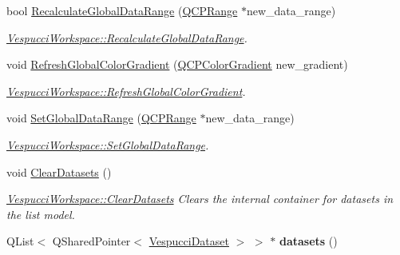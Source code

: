 \begin{DoxyCompactItemize}
\item 
bool \hyperlink{class_vespucci_workspace_a0aefd22de491420f2a172448dafc90fc}{Recalculate\+Global\+Data\+Range} (\hyperlink{class_q_c_p_range}{Q\+C\+P\+Range} $\ast$new\+\_\+data\+\_\+range)
\begin{DoxyCompactList}\small\item\em \hyperlink{class_vespucci_workspace_a0aefd22de491420f2a172448dafc90fc}{Vespucci\+Workspace\+::\+Recalculate\+Global\+Data\+Range}. \end{DoxyCompactList}\item 
void \hyperlink{class_vespucci_workspace_a616ca3bc6a0eed206870a25e484eaccb}{Refresh\+Global\+Color\+Gradient} (\hyperlink{class_q_c_p_color_gradient}{Q\+C\+P\+Color\+Gradient} new\+\_\+gradient)
\begin{DoxyCompactList}\small\item\em \hyperlink{class_vespucci_workspace_a616ca3bc6a0eed206870a25e484eaccb}{Vespucci\+Workspace\+::\+Refresh\+Global\+Color\+Gradient}. \end{DoxyCompactList}\item 
void \hyperlink{class_vespucci_workspace_a2f281b2b05af5a907405eb901ab26633}{Set\+Global\+Data\+Range} (\hyperlink{class_q_c_p_range}{Q\+C\+P\+Range} $\ast$new\+\_\+data\+\_\+range)
\begin{DoxyCompactList}\small\item\em \hyperlink{class_vespucci_workspace_a2f281b2b05af5a907405eb901ab26633}{Vespucci\+Workspace\+::\+Set\+Global\+Data\+Range}. \end{DoxyCompactList}\item 
void \hyperlink{class_vespucci_workspace_a85053e9aa9e55a70f0a54fed14b8316c}{Clear\+Datasets} ()\hypertarget{class_vespucci_workspace_a85053e9aa9e55a70f0a54fed14b8316c}{}\label{class_vespucci_workspace_a85053e9aa9e55a70f0a54fed14b8316c}

\begin{DoxyCompactList}\small\item\em \hyperlink{class_vespucci_workspace_a85053e9aa9e55a70f0a54fed14b8316c}{Vespucci\+Workspace\+::\+Clear\+Datasets} Clears the internal container for datasets in the list model. \end{DoxyCompactList}\item 
Q\+List$<$ Q\+Shared\+Pointer$<$ \hyperlink{class_vespucci_dataset}{Vespucci\+Dataset} $>$ $>$ $\ast$ {\bfseries datasets} ()\hypertarget{class_vespucci_workspace_a46f62db9814ec7e2b913043932d8bd1c}{}\label{class_vespucci_workspace_a46f62db9814ec7e2b913043932d8bd1c}


\end{DoxyCompactItemize}
